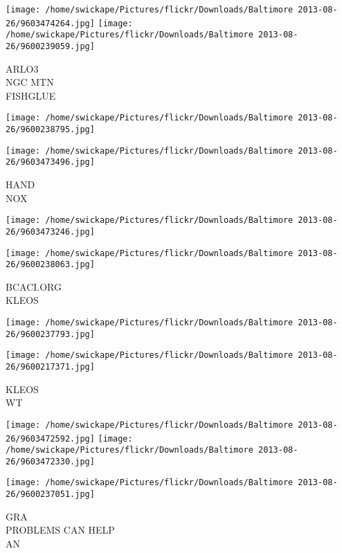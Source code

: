 \documentclass[10pt,letterpaper]{article}
\begin{document}
\vspace{0.25in}
\texttt{[image: /home/swickape/Pictures/flickr/Downloads/Baltimore 2013-08-26/9603474264.jpg]}
\texttt{[image: /home/swickape/Pictures/flickr/Downloads/Baltimore 2013-08-26/9600239059.jpg]}

ARLO3\\
NGC MTN\\
FISHGLUE\\
\pagebreak

\texttt{[image: /home/swickape/Pictures/flickr/Downloads/Baltimore 2013-08-26/9600238795.jpg]}

\vspace{0.25in}
\texttt{[image: /home/swickape/Pictures/flickr/Downloads/Baltimore 2013-08-26/9603473496.jpg]}

HAND\\
NOX\\
\pagebreak

\texttt{[image: /home/swickape/Pictures/flickr/Downloads/Baltimore 2013-08-26/9603473246.jpg]}

\vspace{0.25in}
\texttt{[image: /home/swickape/Pictures/flickr/Downloads/Baltimore 2013-08-26/9600238063.jpg]}

BCACI.ORG\\
KLEOS\\
\pagebreak

\texttt{[image: /home/swickape/Pictures/flickr/Downloads/Baltimore 2013-08-26/9600237793.jpg]}

\vspace{0.25in}
\texttt{[image: /home/swickape/Pictures/flickr/Downloads/Baltimore 2013-08-26/9600217371.jpg]}

KLEOS\\
WT\\
\pagebreak

\texttt{[image: /home/swickape/Pictures/flickr/Downloads/Baltimore 2013-08-26/9603472592.jpg]}
\texttt{[image: /home/swickape/Pictures/flickr/Downloads/Baltimore 2013-08-26/9603472330.jpg]}

\texttt{[image: /home/swickape/Pictures/flickr/Downloads/Baltimore 2013-08-26/9600237051.jpg]}

GRA\\
PROBLEMS CAN HELP\\
AN\\
\pagebreak
\end{document}
